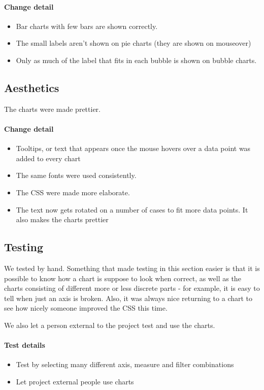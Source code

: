   \paragraph{Change detail}
  \begin{itemize}
  	\item Bar charts with few bars are shown correctly. 
  	\item The small labels aren't shown on pie charts (they are shown on mouseover)
  	\item Only as much of the label that fits in each bubble is shown on bubble charts.
\end{itemize}
  

\pagebreak[4]
\subsection{Aesthetics}
The charts were made prettier.
  
\paragraph{Change detail}
\begin{itemize}
  \item Tooltips, or text that appears once the mouse hovers over a data point was added to every chart
  \item The same fonts were used consistently.
  \item The CSS were made more elaborate.
  \item The text now gets rotated on a number of cases to fit more data points. It also makes the charts prettier

\end{itemize}
 
\subsection{Testing}
 We tested by hand. Something that made testing in this section easier is that it is possible to know
 how a chart is suppose to look when correct, as well as the charts consisting of different more or less discrete
 parts - for example, it is easy to tell when just an axis is broken.
 Also, it was always nice returning to a chart to see how nicely someone improved the CSS this time. 
 
 We also let a person external to the project test and use the charts.

\paragraph{Test details}
\begin{itemize}
  \item Test by selecting many different axis, measure and filter combinations
  \item Let project external people use charts
\end{itemize}


